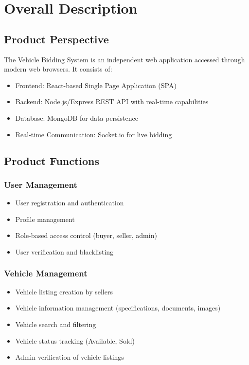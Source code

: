 \documentclass[12pt,a4paper]{report}
\begin{document}
\chapter{Overall Description}
\section{Product Perspective}
The Vehicle Bidding System is an independent web application accessed through modern web browsers. It consists of:
\begin{itemize}
    \item Frontend: React-based Single Page Application (SPA)
    \item Backend: Node.js/Express REST API with real-time capabilities
    \item Database: MongoDB for data persistence
    \item Real-time Communication: Socket.io for live bidding
\end{itemize}

\section{Product Functions}
\subsection{User Management}
\begin{itemize}
    \item User registration and authentication
    \item Profile management
    \item Role-based access control (buyer, seller, admin)
    \item User verification and blacklisting
\end{itemize}

\subsection{Vehicle Management}
\begin{itemize}
    \item Vehicle listing creation by sellers
    \item Vehicle information management (specifications, documents, images)
    \item Vehicle search and filtering
    \item Vehicle status tracking (Available, Sold)
    \item Admin verification of vehicle listings
\end{itemize}
\end{document}
